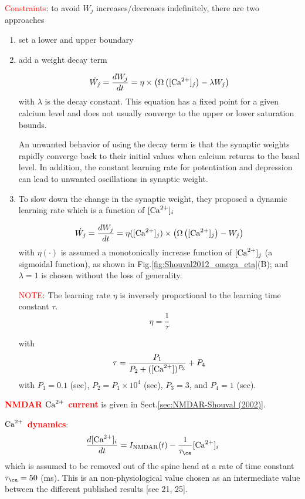 \textcolor{red}{Constraints}: to avoid $W_j$ increases/decreases indefinitely,
there are two approaches
\begin{enumerate}
  \item set a lower and upper boundary
  \item add a weight decay term
  
\begin{equation}
\dot{W_j} =\frac{dW_j}{dt} = \eta \times \left(\Omega\left( [{\text{Ca}^{2+}}]_j \right) -
\lambda W_j \right) 
\end{equation}
with $\lambda$ is the decay constant. 
This equation has a fixed point for a given calcium level and does not usually
converge to the upper or lower saturation bounds.

An unwanted behavior of using the decay term is that the synaptic weights
rapidly converge back to their initial values when calcium returns to the basal
level. In addition, the constant learning rate for potentiation and depression
can lead to unwanted oscillations in synaptic weight.

  \item To slow down the change in the synaptic weight, they proposed a dynamic
  learning rate which is a function of $[{\text{Ca}^{2+}}]_i$
  
\begin{equation}
\dot{W_j} =\frac{dW_j}{dt} = \eta([{\text{Ca}^{2+}}]_j) \times \left(\Omega\left( [{\text{Ca}^{2+}}]_j
\right) - W_j \right)
\end{equation}
with $\eta(\cdot)$ is assumed a monotonically increase function of $[{\text{Ca}^{2+}}]_j$ (a
sigmoidal function), as shown in Fig.\ref{fig:Shouval2012_omega_eta}(B); and
$\lambda=1$ is chosen without the loss of generality.
  
 \textcolor{red}{NOTE}: The learning rate $\eta$ is inversely proportional to
 the learning time constant $\tau$.
\begin{equation}
\eta = \frac{1}{\tau}
\end{equation}

with 
\begin{equation}
\tau = \frac{P_1} {P_2 + ([{\text{Ca}^{2+}}])^{P_3}} + P_4
\end{equation}
with $P_1 = 0.1$ (sec), $P_2 = P_1 \times 10^4$ (sec), $P_3 = 3$, and 
$P_4 = 1$ (sec).


\end{enumerate}

\textcolor{red}{\bf NMDAR ${\text{Ca}^{2+}}$ current} is given in Sect.\ref{sec:NMDAR-Shouval
(2002)}.


\textcolor{red}{\bf ${\text{Ca}^{2+}}$ dynamics}:
\begin{equation}
\frac{d[\Ca]_i}{dt} = I_\NMDA(t) - \frac{1}{\tau_\ca} [\Ca]_i
\end{equation}
which is assumed to be removed out of the spine head at a rate of time constant
$\tau_\ca = 50$ (ms). This is an non-physiological value chosen as
an intermediate value between the different published results [see 21, 25].


